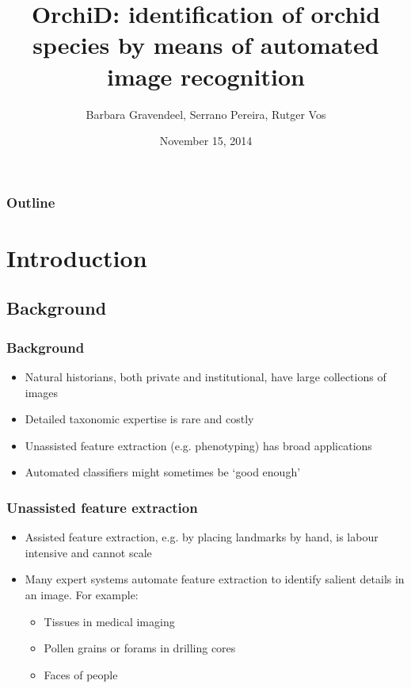 \documentclass[]{beamer}
\title[OrchiD]
    {OrchiD: identification of orchid species by means of automated image recognition}
\author[Gravendeel, Pereira, Vos]
    {Barbara Gravendeel\inst{1}, Serrano Pereira\inst{1}, Rutger Vos\inst{1}}
\institute[Naturalis Biodiversity Center]
{
  \inst{1}
  Naturalis Biodiversity Center, The Netherlands
}
\date{November 15, 2014}
\begin{document}
\frame{\titlepage}


\begin{frame}
    \frametitle{Outline}
    \tableofcontents
\end{frame}


\section{Introduction}

	\subsection{Background}
	\begin{frame}
		\frametitle{Background}
		\begin{itemize}
			\item Natural historians, both private and institutional, have large
			collections of images
			\item Detailed taxonomic expertise is rare and costly
			\item Unassisted feature extraction (e.g. phenotyping) has broad applications
			\item Automated classifiers might sometimes be `good enough'
		\end{itemize}
	\end{frame}

	\begin{frame}
		\frametitle{Unassisted feature extraction}
		\begin{itemize}
			\item Assisted feature extraction, e.g. by placing landmarks by hand, is
			labour intensive and cannot scale
			\item Many expert systems automate feature extraction to identify salient
			details in an image. For example:
			\begin{itemize}
				\item Tissues in medical imaging
				\item Pollen grains or forams in drilling cores
				\item Faces of people
			\end{itemize}
		\end{itemize}
	\end{frame}
\end{document}

